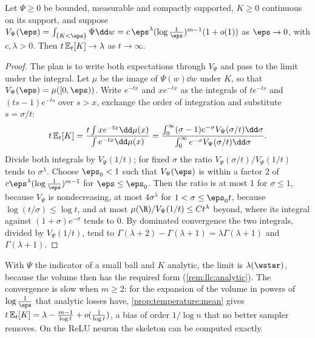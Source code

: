 \begin{refsection}
\begin{lemma}\label{lem:llc:population}
Let $\Psi\ge0$ be bounded, measurable and compactly supported, $K\ge0$ continuous on its support, and suppose $V_\Psi(\eps)=\int_{\{K<\eps\}}\Psi\dd w=c\,\eps^\lambda(\log\frac1\eps)^{m-1}(1+o(1))$ as $\eps\to0$, with $c,\lambda>0$. Then $t\,\mathbb{E}_{t}\!\left[K\right]\to\lambda$ as $t\to\infty$.
\end{lemma}

\begin{proof}
The plan is to write both expectations through $V_\Psi$ and pass to the limit under the integral. Let $\mu$ be the image of $\Psi(w)\dd w$ under $K$, so that $V_\Psi(\eps)=\mu([0,\eps))$. Write $e^{-tx}$ and $xe^{-tx}$ as the integrals of $te^{-ts}$ and $(ts-1)e^{-ts}$ over $s>x$, exchange the order of integration and substitute $s=\sigma/t$:
\[
t\,\llcpop{K}=\frac{t\int xe^{-tx}\dd\mu(x)}{\int e^{-tx}\dd\mu(x)}=\frac{\int_0^\infty(\sigma-1)e^{-\sigma}V_\Psi(\sigma/t)\dd\sigma}{\int_0^\infty e^{-\sigma}V_\Psi(\sigma/t)\dd\sigma}.
\]
Divide both integrals by $V_\Psi(1/t)$; for fixed $\sigma$ the ratio $V_\Psi(\sigma/t)/V_\Psi(1/t)$ tends to $\sigma^\lambda$. Choose $\eps_0<1$ such that $V_\Psi(\eps)$ is within a factor $2$ of $c\eps^\lambda(\log\frac1\eps)^{m-1}$ for $\eps\le\eps_0$. Then the ratio is at most $1$ for $\sigma\le1$, because $V_\Psi$ is nondecreasing, at most $4\sigma^\lambda$ for $1<\sigma\le\eps_0t$, because $\log(t/\sigma)\le\log t$, and at most $\mu(\R)/V_\Psi(1/t)\le Ct^\lambda$ beyond, where its integral against $(1+\sigma)e^{-\sigma}$ tends to $0$. By dominated convergence the two integrals, divided by $V_\Psi(1/t)$, tend to $\Gamma(\lambda+2)-\Gamma(\lambda+1)=\lambda\Gamma(\lambda+1)$ and $\Gamma(\lambda+1)$.
\end{proof}

With $\Psi$ the indicator of a small ball and $K$ analytic, the limit is $\lambda(\wstar)$, because the volume then has the required form (\cref{rem:llc:analytic}). The convergence is slow when $m\ge2$: for the expansion of the volume in powers of $\log\frac1\eps$ that analytic losses have, \cref{prop:temperature:mean} gives $t\,\mathbb{E}_{t}\!\left[K\right]=\lambda-\frac{m-1}{\log t}+o(\frac1{\log t})$, a bias of order $1/\log n$ that no better sampler removes. On the ReLU neuron the skeleton can be computed exactly.


\end{refsection}
